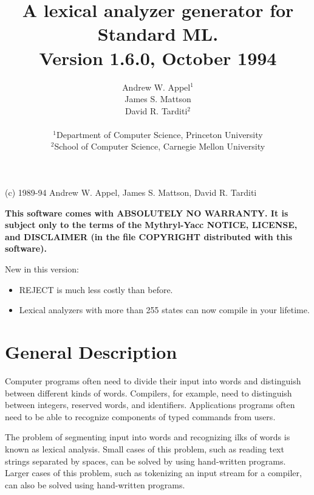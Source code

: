 \title{        A lexical analyzer generator for Standard ML.\\
			       Version 1.6.0, October 1994
      }
\author{                    Andrew W. Appel$^1$\\
	                    James S. Mattson\\
        	            David R. Tarditi$^2$\\
\\              
\small
$^1$Department of Computer Science, Princeton University \\
\small
$^2$School of Computer Science, Carnegie Mellon University
}
\date{}

\maketitle
\begin{center}
(c) 1989-94 Andrew W. Appel, James S. Mattson, David R. Tarditi
\end{center}

{\bf
This software comes with ABSOLUTELY NO WARRANTY.  It is subject only to
the terms of the Mythryl-Yacc NOTICE, LICENSE, and DISCLAIMER (in the
file COPYRIGHT distributed with this software).
}

\vspace{1in}

New in this version:  
\begin{itemize}
\item REJECT is much less costly than before.
\item Lexical analyzers with more than 255 states can now compile in your
lifetime.
\end{itemize}

\newpage
\tableofcontents
\newpage

\section{General Description}

Computer programs often need to divide their input into words and
distinguish between different kinds of words.  Compilers, for
example, need to distinguish between integers, reserved words, and
identifiers.  Applications programs often need to be able to
recognize components of typed commands from users.

The problem of segmenting input into words and recognizing ilks of
words is known as lexical analysis.  Small cases of this problem,
such as reading text strings separated by spaces, can be solved by
using hand-written programs.  Larger cases of this problem, such as
tokenizing an input stream for a compiler, can also be solved using
hand-written programs.

